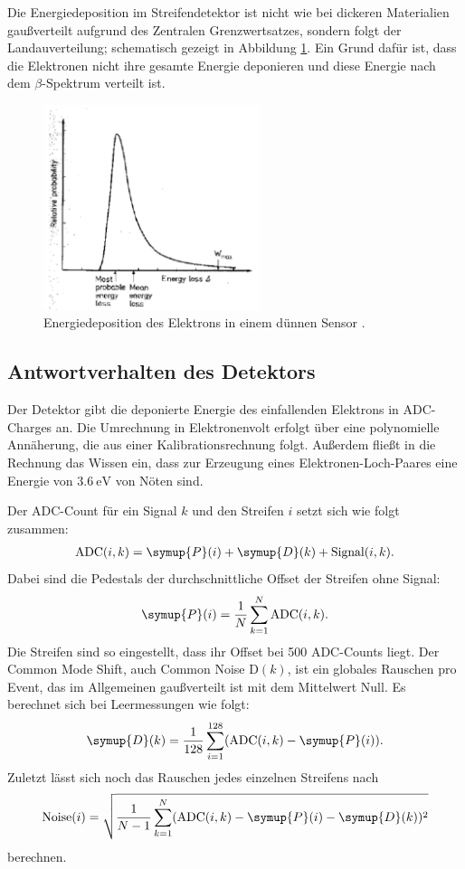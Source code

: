 Die Energiedeposition im Streifendetektor ist nicht wie bei dickeren Materialien gaußverteilt aufgrund des Zentralen Grenzwertsatzes, sondern folgt der Landauverteilung; schematisch gezeigt in Abbildung \ref{fig:energiedepositionElektron}. Ein Grund dafür ist, dass die Elektronen nicht ihre gesamte Energie deponieren und diese Energie nach dem $\beta$-Spektrum verteilt ist.
\begin{figure}
  \centering
  \includegraphics[height=6cm]{TimosAufrisse/energiedepositionElektron.png}
  \caption{Energiedeposition des Elektrons in einem dünnen Sensor \cite{anleitung}.}
  \label{fig:energiedepositionElektron}
\end{figure}

\subsection{Antwortverhalten des Detektors}

Der Detektor gibt die deponierte Energie des einfallenden Elektrons in ADC-Charges an. Die Umrechnung in Elektronenvolt erfolgt über eine polynomielle Annäherung, die aus einer Kalibrationsrechnung folgt. Außerdem fließt in die Rechnung das Wissen ein, dass zur Erzeugung eines Elektronen-Loch-Paares eine Energie von $\SI{3.6}{\electronvolt}$ von Nöten sind.

Der ADC-Count für ein Signal $k$ und den Streifen $i$ setzt sich wie folgt zusammen:
\begin{align}
  \text{ADC}(i, k) = \symup{P}(i) + \symup{D}(k) + \text{Signal}(i, k).
\end{align}
Dabei sind die Pedestals der durchschnittliche Offset der Streifen ohne Signal:
\begin{align}
  \symup{P}(i) = \frac{1}{N} \sum_{k=1}^N \text{ADC}(i, k).
\end{align}
Die Streifen sind so eingestellt, dass ihr Offset bei \num{500} ADC-Counts liegt.
Der Common Mode Shift, auch Common Noise D$(k)$, ist ein globales Rauschen pro Event, das im Allgemeinen gaußverteilt ist mit dem Mittelwert Null. Es berechnet sich bei Leermessungen wie folgt:
\begin{align}
  \symup{D}(k) = \frac{1}{128} \sum_{i=1}^{128} (\text{ADC}(i, k) - \symup{P}(i)).
\end{align}
Zuletzt lässt sich noch das Rauschen jedes einzelnen Streifens nach
\begin{align}
  \text{Noise}(i) = \sqrt{\frac{1}{N-1} \sum_{k=1}^N(\text{ADC}(i, k) - \symup{P}(i) - \symup{D}(k))^2}
\end{align}
berechnen.


